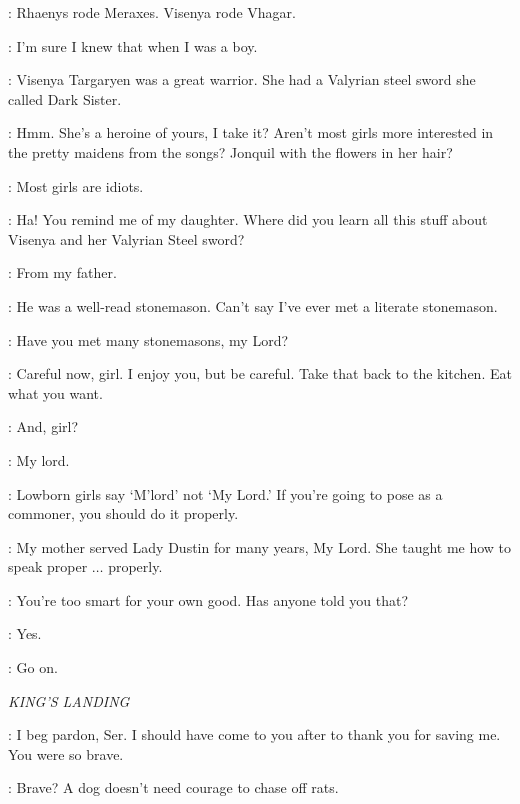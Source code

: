 \ARYA: Rhaenys rode Meraxes. Visenya rode Vhagar.

\TYWIN: I'm sure I knew that when I was a boy.

\ARYA: Visenya Targaryen was a great warrior. She had a Valyrian steel sword she called Dark Sister.

\TYWIN: Hmm. She's a heroine of yours, I take it? Aren't most girls more interested in the pretty maidens from the songs? Jonquil with the flowers in her hair?

\ARYA: Most girls are idiots.

\TYWIN: Ha! You remind me of my daughter. Where did you learn all this stuff about Visenya and her Valyrian Steel sword?

\ARYA: From my father.

\TYWIN: He was a well-read stonemason. Can't say I've ever met a literate stonemason.

\ARYA: Have you met many stonemasons, my Lord?

\TYWIN: Careful now, girl. I enjoy you, but be careful. Take that back to the kitchen. Eat what you want.


\TYWIN: And, girl?


\TYWIN: My lord.


\TYWIN: Lowborn girls say `M'lord' not `My Lord.' If you're going to pose as a commoner, you should do it properly.

\ARYA: My mother served Lady Dustin for many years, My Lord. She taught me how to speak proper $\ldots$ properly.

\TYWIN: You're too smart for your own good. Has anyone told you that?

\ARYA: Yes.

\TYWIN: Go on.



\scene

\textit{KING'S LANDING}


\SANSA: I beg pardon, Ser. I should have come to you after to thank you for saving me. You were so brave.

\HOUND: Brave? A dog doesn't need courage to chase off rats.


